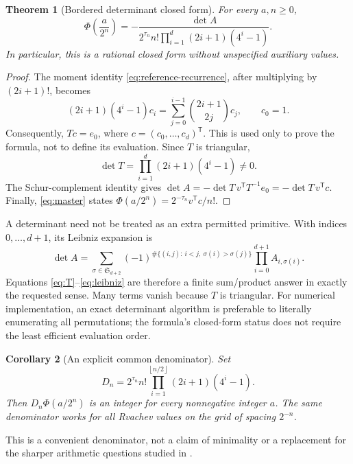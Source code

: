 \documentclass[11pt,a4paper]{article}
\newtheorem{theorem}{Theorem}[section]
\newtheorem{corollary}[theorem]{Corollary}
\theoremstyle{definition}
\theoremstyle{remark}
\newcommand{\floor}[1]{\left\lfloor #1\right\rfloor}
\begin{document}
\begin{theorem}[Bordered determinant closed form]
For every \(a,n\geq0\),
\begin{equation}
 \boxed{\displaystyle
 \Phi\!\left(\frac a{2^n}\right)
  =-\frac{\det A}
   {2^{\tau_n}n!\displaystyle\prod_{i=1}^{d}(2i+1)(4^i-1)}.}
                                                               \label{eq:det-main}
\end{equation}
In particular, this is a rational closed form without unspecified auxiliary values.
\end{theorem}
\begin{proof}
The moment identity \eqref{eq:reference-recurrence}, after multiplying by
\((2i+1)!\), becomes
\[
 (2i+1)(4^i-1)c_i=\sum_{j=0}^{i-1}\binom{2i+1}{2j}c_j,
 \qquad c_0=1.
\]
Consequently, \(Tc=e_0\), where \(c=(c_0,\ldots,c_d)^{\mathsf T}\).
This is used only to prove the formula, not to define its evaluation.
Since \(T\) is triangular,
\[
 \det T=\prod_{i=1}^{d}(2i+1)(4^i-1)\ne0.
\]
The Schur-complement identity gives
\(\det A=-\det T\,v^{\mathsf T}T^{-1}e_0=-\det T\,v^{\mathsf T}c\).
Finally, \eqref{eq:master} states
\(\Phi(a/2^n)=2^{-\tau_n}v^{\mathsf T}c/n!\).
\end{proof}

A determinant need not be treated as an extra permitted primitive.  With indices
\(0,\ldots,d+1\), its Leibniz expansion is
\begin{equation}
 \det A=\sum_{\sigma\in\mathfrak S_{d+2}}
     (-1)^{\#\{(i,j):\,i<j,\ \sigma(i)>\sigma(j)\}}
       \prod_{i=0}^{d+1}A_{i,\sigma(i)}.                \label{eq:leibniz}
\end{equation}
Equations \eqref{eq:T}--\eqref{eq:leibniz} are therefore a finite sum/product answer
in exactly the requested sense.  Many terms vanish because \(T\) is triangular.
For numerical implementation, an exact determinant algorithm is preferable to
literally enumerating all permutations; the formula's closed-form status does not
require the least efficient evaluation order.

\begin{corollary}[An explicit common denominator]
Set
\begin{equation}
 D_n=2^{\tau_n}n!\prod_{i=1}^{\floor{n/2}}(2i+1)(4^i-1).
                                                               \label{eq:denominator}
\end{equation}
Then \(D_n\Phi(a/2^n)\) is an integer for every nonnegative integer \(a\).
The same denominator works for all Rvachev values on the grid of spacing \(2^{-n}\).
\end{corollary}
This is a convenient denominator, not a claim of minimality or a replacement for
the sharper arithmetic questions studied in \cite{arias2018}.
\end{document}
